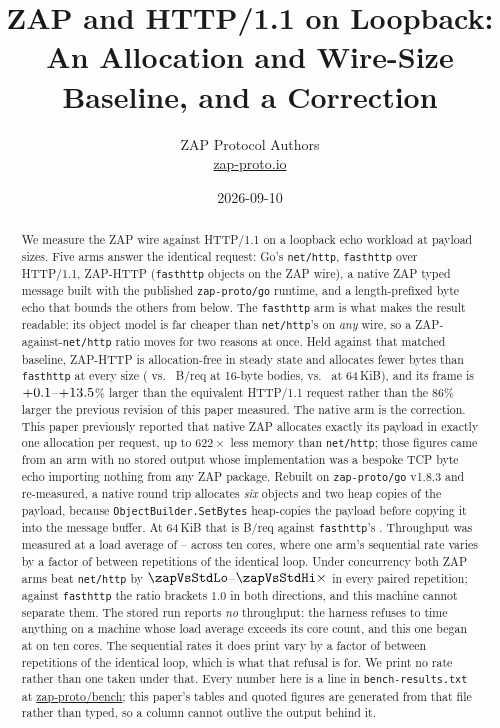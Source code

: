 \documentclass[11pt]{article}
\title{\texorpdfstring{ZAP and HTTP/1.1 on Loopback: \\
\large An Allocation and Wire-Size Baseline, and a Correction}%
{ZAP and HTTP/1.1 on Loopback: An Allocation and Wire-Size Baseline, and a Correction}}
\author{ZAP Protocol Authors\\\href{https://zap-proto.io}{zap-proto.io}}
\date{2026-09-10}
\begin{document}
\maketitle

\begin{abstract}
We measure the ZAP wire against HTTP/1.1 on a loopback echo workload at \nWorkloads{}
payload sizes. Five arms answer the identical request: Go's \texttt{net/http},
\texttt{fasthttp} over HTTP/1.1, ZAP-HTTP (\texttt{fasthttp} objects on the ZAP
wire), a native ZAP typed message built with the published
\texttt{zap-proto/go} runtime, and a length-prefixed byte echo that bounds the
others from below. The \texttt{fasthttp} arm is what makes the result readable:
its object model is far cheaper than \texttt{net/http}'s on \emph{any} wire, so a
ZAP-against-\texttt{net/http} ratio moves for two reasons at once. Held against
that matched baseline, ZAP-HTTP is allocation-free in steady state and allocates
fewer bytes than \texttt{fasthttp} at every size (\zapTiny{} vs.\ \fastTiny{}
B/req at 16-byte bodies, \zapLarge{} vs.\ \fastLarge{} at 64\,KiB), and its frame
is $+0.1$--$+13.5$\% larger than
the equivalent HTTP/1.1 request rather than the 86\% larger the previous revision
of this paper measured. The native arm is the correction. This paper previously
reported that native ZAP allocates exactly its payload in exactly one allocation
per request, up to $622\times$ less memory than \texttt{net/http}; those figures
came from an arm with no stored output whose implementation was a bespoke TCP byte
echo importing nothing from any ZAP package. Rebuilt on \texttt{zap-proto/go}
v1.8.3 and re-measured, a native round trip allocates \emph{six} objects and
two heap copies of the payload, because \texttt{ObjectBuilder.SetBytes}
heap-copies the payload before copying it into the message buffer. At 64\,KiB that
is \natLarge{} B/req against \texttt{fasthttp}'s \fastLarge.
\ifconcMeasured%
Throughput was measured at a load average of \loadLo--\loadHi{} across ten
cores, where one arm's sequential rate varies by a factor of \spreadFactor{}
between repetitions of the identical loop. Under concurrency both ZAP arms beat
\texttt{net/http} by $\zapVsStdLo$--$\zapVsStdHi\times$ in every paired
repetition; against \texttt{fasthttp} the ratio brackets $1.0$ in both
directions, and this machine cannot separate them.%
\else%
The stored run reports \emph{no} throughput: the harness refuses to time
anything on a machine whose load average exceeds its core count, and this one
began at \loadStart{} on ten cores. The sequential rates it does print vary by a
factor of \spreadFactor{} between repetitions of the identical loop, which is
what that refusal is for. We print no rate rather than one taken under that.%
\fi{} Every number here is a line in
\texttt{bench-results.txt} at \href{https://github.com/zap-proto/bench}{zap-proto/bench};
this paper's tables and quoted figures are generated from that file rather than
typed, so a column cannot outlive the output behind it.
\end{abstract}
\end{document}
